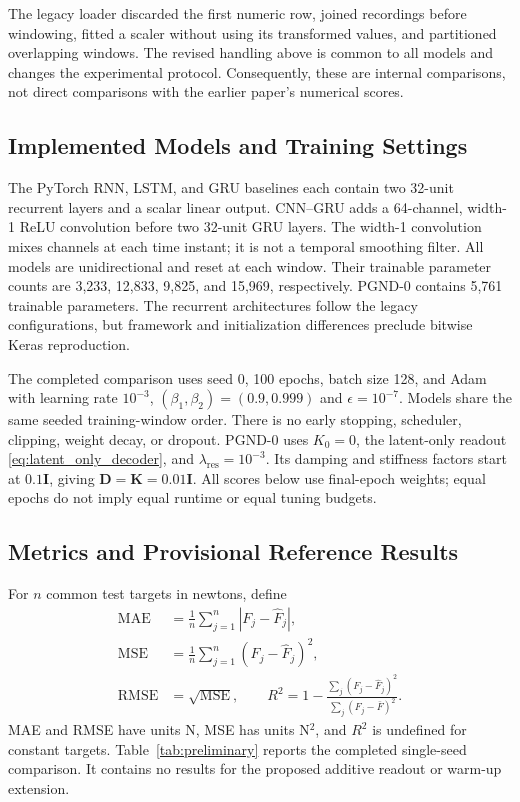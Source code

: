 \documentclass[journal,twoside]{IEEEtran}
\begin{document}
The legacy loader discarded the first numeric row, joined recordings
before windowing, fitted a scaler without using its transformed values,
and partitioned overlapping windows. The revised handling above is common
to all models and changes the experimental protocol. Consequently, these
are internal comparisons, not direct comparisons with the earlier
paper's numerical scores.

\subsection{Implemented Models and Training Settings}
The PyTorch RNN, LSTM, and GRU baselines each contain two 32-unit recurrent
layers and a scalar linear output. CNN--GRU adds a 64-channel, width-1
ReLU convolution before two 32-unit GRU layers. The width-1 convolution
mixes channels at each time instant; it is not a temporal smoothing
filter. All models are unidirectional and reset at each window.
Their trainable parameter counts are 3,233, 12,833, 9,825, and 15,969,
respectively. PGND-0 contains 5,761 trainable parameters. The recurrent
architectures follow the legacy configurations, but framework and
initialization differences preclude bitwise Keras reproduction.

The completed comparison uses seed 0, 100 epochs, batch size 128, and Adam
with learning rate $10^{-3}$, $(\beta_1,\beta_2)=(0.9,0.999)$ and
$\epsilon=10^{-7}$. Models share the same seeded training-window order.
There is no early stopping, scheduler, clipping, weight decay, or dropout.
PGND-0 uses $K_0=0$, the latent-only readout
\eqref{eq:latent_only_decoder}, and $\lambda_{\mathrm{res}}=10^{-3}$.
Its damping and stiffness factors start at $0.1\mathbf I$, giving
$\mathbf D=\mathbf K=0.01\mathbf I$. All scores below use final-epoch
weights; equal epochs do not imply equal runtime or equal tuning budgets.

\subsection{Metrics and Provisional Reference Results}
For $n$ common test targets in newtons, define
\begin{align}
    \mathrm{MAE}&=\frac1n\sum_{j=1}^n|F_j-\hat F_j|,\\
    \mathrm{MSE}&=\frac1n\sum_{j=1}^n(F_j-\hat F_j)^2,\\
    \mathrm{RMSE}&=\sqrt{\mathrm{MSE}},\qquad
    R^2=1-\frac{\sum_j(F_j-\hat F_j)^2}
                  {\sum_j(F_j-\bar F)^2}.
\end{align}
MAE and RMSE have units N, MSE has units N$^2$, and $R^2$ is undefined
for constant targets. Table~\ref{tab:preliminary} reports the completed
single-seed comparison. It contains no results for the proposed additive
readout or warm-up extension.
\end{document}
